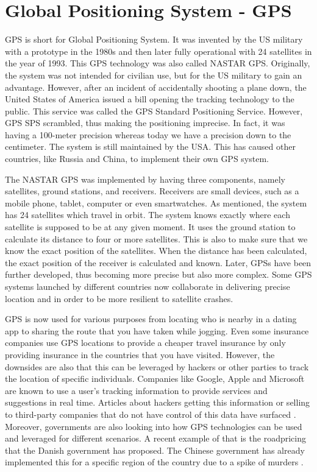 \section{Global Positioning System - GPS}
GPS is short for Global Positioning System. It was invented by the US military with a prototype in the 1980s and then later fully operational with 24 satellites in the year of 1993. This GPS technology was also called NASTAR GPS. Originally, the system was not intended for civilian use, but for the US military to gain an advantage. However, after an incident of accidentally shooting a plane down, the United States of America issued a bill opening the tracking technology to the public. This service was called the GPS Standard Positioning Service. However, GPS SPS scrambled, thus making the positioning imprecise. In fact, it was having a 100-meter precision whereas today we have a precision down to the centimeter. The system is still maintained by the USA. This has caused other countries, like Russia and China, to implement their own GPS system.

The NASTAR GPS was implemented by having three components, namely satellites, ground stations, and receivers. Receivers are small devices, such as a mobile phone, tablet, computer or even smartwatches. As mentioned, the system has 24 satellites which travel in orbit. The system knows exactly where each satellite is supposed to be at any given moment. It uses the ground station to calculate its distance to four or more satellites. This is also to make sure that we know the exact position of the satellites. When the distance has been calculated, the exact position of the receiver is calculated and known. Later, GPSs have been further developed, thus becoming more precise but also more complex. Some GPS systems launched by different countries now collaborate in delivering precise location and in order to be more resilient to satellite crashes. 

GPS is now used for various purposes from locating who is nearby in a dating app to sharing the route that you have taken while jogging. Even some insurance companies use GPS locations to provide a cheaper travel insurance by only providing insurance in the countries that you have visited. However, the downsides are also that this can be leveraged by hackers or other parties to track the location of specific individuals. Companies like Google, Apple and Microsoft are known to use a user's tracking information to provide services and suggestions in real time. Articles about hackers getting this information or selling to third-party companies that do not have control of this data  have surfaced . Moreover, governments are also looking into how GPS technologies can be used and leveraged for different scenarios. A recent example of that is the roadpricing that the Danish government has proposed. The Chinese government has already implemented this for a specific region of the country due to a spike of murders \cite{guardian:2017}.

